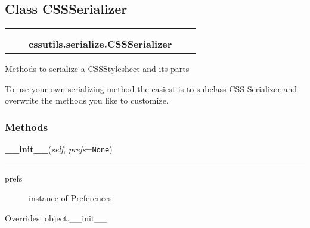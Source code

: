 

\subsection{Class CSSSerializer}

    \label{cssutils:serialize:CSSSerializer}
\begin{tabular}{cccccc}
\multicolumn{2}{r}{\settowidth{\BCL}{object}\multirow{2}{\BCL}{object}}
&&
  \\\cline{3-3}
  &&\multicolumn{1}{c|}{}
&&
  \\
&&\multicolumn{2}{l}{\textbf{cssutils.serialize.CSSSerializer}}
\end{tabular}


Methods to serialize a CSSStylesheet and its parts

To use your own serializing method the easiest is to subclass CSS
Serializer and overwrite the methods you like to customize.


  \subsubsection{Methods}

    \vspace{0.5ex}

\hspace{.8\funcindent}\begin{boxedminipage}{\funcwidth}

    \raggedright \textbf{\_\_init\_\_}(\textit{self}, \textit{prefs}={\tt None})

    \vspace{-1.5ex}

    \rule{\textwidth}{0.5\fboxrule}
\setlength{\parskip}{2ex}
\begin{description}
\item[{prefs}] \leavevmode 
instance of Preferences

\end{description}
\setlength{\parskip}{1ex}
      Overrides: object.\_\_init\_\_

    \end{boxedminipage}

